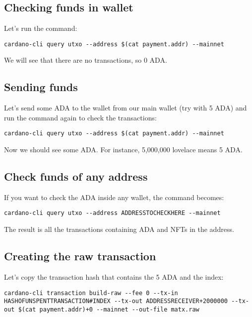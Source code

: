 \subsection*{Checking funds in wallet}

Let's run the command:

\begin{lstlisting}
cardano-cli query utxo --address $(cat payment.addr) --mainnet
\end{lstlisting}

We will see that there are no transactions, so 0 ADA.

\subsection*{Sending funds}

Let's send some ADA to the wallet from our main wallet (try with 5 ADA) and run the command again to check the transactions:

\begin{lstlisting}
cardano-cli query utxo --address $(cat payment.addr) --mainnet
\end{lstlisting}

Now we should see some ADA. For instance, 5,000,000 lovelace means 5 ADA.

\subsection*{Check funds of any address}

If you want to check the ADA inside any wallet, the command becomes:

\begin{lstlisting}
cardano-cli query utxo --address ADDRESSTOCHECKHERE --mainnet
\end{lstlisting}

The result is all the transactions containing ADA and NFTs in the address.

\subsection*{Creating the raw transaction}

Let's copy the transaction hash that contains the 5 ADA and the index:

\begin{lstlisting}
cardano-cli transaction build-raw --fee 0 --tx-in HASHOFUNSPENTTRANSACTION#INDEX --tx-out ADDRESSRECEIVER+2000000 --tx-out $(cat payment.addr)+0 --mainnet --out-file matx.raw
\end{lstlisting}

